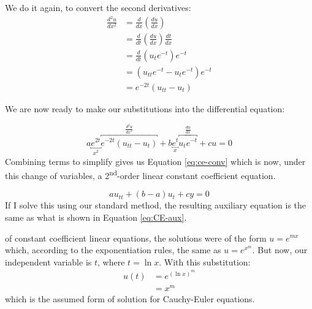 We do it again, to convert the second derivatives:
\begin{align*}
\frac{d^2u}{dx^2} &= \frac{d}{dx}\left(\frac{du}{dx}\right) \\
&= \frac{d}{dt}\left(\frac{du}{dx}\right)\frac{dt}{dx} \\
&=\frac{d}{dt}\left(u_t e^{-t}\right)e^{-t} \\
&= \left(u_{tt}e^{-t}-u_te^{-t}\right)e^{-t} \\
&= e^{-2t}\left(u_{tt} - u_{t} \right)
\end{align*}

We are now ready to make our substitutions into the differential equation:

\begin{equation*}
a\underbracket{e^{2t}}_{x^2}\overbracket{e^{-2t}\left(u_{tt}-u_t\right)}^{\frac{d^2u}{dx^2}}+b\underbracket{e^{t}}_{x}\overbracket{u_te^{-t}}^{\frac{du}{dx}}+cu=0
\end{equation*}
Combining terms to simplify gives us Equation \ref{eq:ce-conv} which is now, under this change of variables, a 2\textsuperscript{nd}-order linear constant coefficient equation.

\begin{equation}
au_{tt} + (b-a)u_t + cy = 0
\label{eq:ce-conv}
\end{equation}
If I solve this using our standard method, the resulting auxiliary equation is the same as what is shown in Equation \ref{eq:CE-aux}.

 of constant coefficient linear equations, the solutions were of the form $u = e^{mx}$ which, according to the exponentiation rules, the same as $u = e^{x^m}$.  But now, our independent variable is $t$, where $t=\ln{x}$. With this substitution:
\begin{align*}
u(t) &= e^{(\ln{x})^m} \\
&= x^m
\end{align*}
which is the assumed form of solution for Cauchy-Euler equations.


